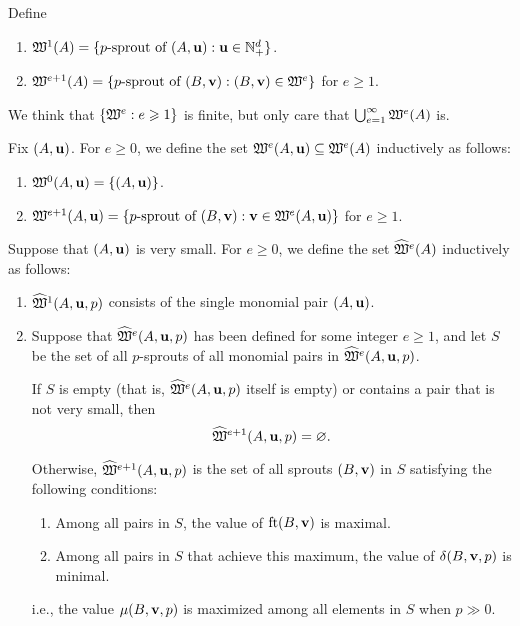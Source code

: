 \documentclass[11pt]{amsart}
\begin{document}
\begin{definition}
 Define
\begin{enumerate}
\item $\mathfrak{W}^1(A) = \{ p\text{-sprout of } (A, \mathbf{u}) : \mathbf{u} \in \mathbb{N}_+^d \}$.
\item $\mathfrak{W}^{e+1}(A) = \{ p\text{-sprout of } (B, \mathbf{v}) : (B, \mathbf{v}) \in \mathfrak{W}^e  \}$ for $e \geq 1$. 
\end{enumerate}
\end{definition}


We think that $\{ \mathfrak{W}^e : e \geqslant 1 \}$ is finite, but only care that $\bigcup_{e=1}^\infty \mathfrak{W}^e(A)$ is.


\begin{definition}
Fix $(A, \mathbf{u})$. 
For $e\geq 0$, we define the set $\mathfrak{W}^e(A, \mathbf{u}) \subseteq \mathfrak{W}^e(A)$ inductively as follows:
\begin{enumerate}
 \item $\mathfrak{W}^0(A, \mathbf{u}) = \{ (A, \mathbf{u}) \}$.
\item $\mathfrak{W}^{e+1}(A, \mathbf{u}) = \{ p\text{-sprout of } (B, \mathbf{v}) : \mathbf{v} \in \mathfrak{W}^e(A, \mathbf{u}) \}$ for $e \geq 1$.
\end{enumerate}
\end{definition}


\begin{definition}
Suppose that $(A, \mathbf{u})$ is very small.  For $e \geq 0$, we define the set $\widehat{\mathfrak{W}}^e(A)$ inductively as follows:
\begin{enumerate}
\item $\widehat{\mathfrak{W}}^1(A, \mathbf{u}, p)$ consists of the single monomial pair $(A, \mathbf{u})$.
\item Suppose that $\widehat{\mathfrak{W}}^e(A, \mathbf{u}, p)$ has been defined for some integer $e \geq 1$, and let $S$ be the set of all $p$-sprouts of all monomial pairs in $\widehat{\mathfrak{W}}^e(A, \mathbf{u}, p)$.


If  $S$ is empty (that is, $\widehat{\mathfrak{W}}^e(A, \mathbf{u}, p)$ itself is empty) or contains a pair that is not very small, then \[ \widehat{\mathfrak{W}}^{e+1}(A, \mathbf{u}, p) = \varnothing.\]  

Otherwise, $\widehat{\mathfrak{W}}^{e+1}(A, \mathbf{u}, p)$ is the set of all sprouts $(B, \mathbf{v})$ in $S$ satisfying the following conditions:    

\begin{enumerate}
\item Among all pairs in $S$, the value of  $\operatorname{ft}(B, \mathbf{v})$ is maximal.
\item Among all pairs in $S$ that achieve this maximum, the value of $\delta(B, \mathbf{v}, p)$ is minimal.
\end{enumerate}
i.e., the value $\mu(B, \mathbf{v},p)$ is maximized among all elements in $S$ when $p \gg 0$. 
\end{enumerate}


\end{definition}
\end{document}
